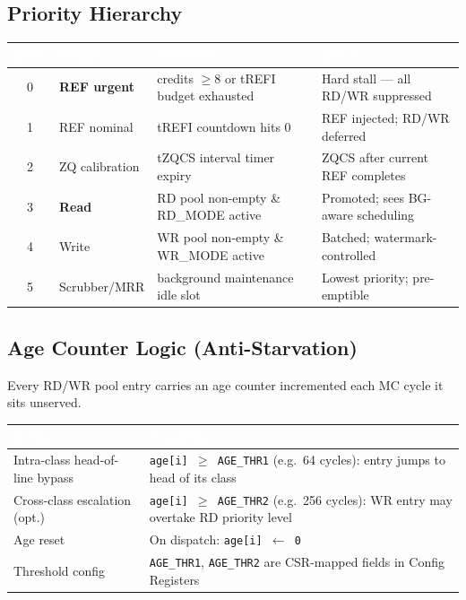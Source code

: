 \documentclass[11pt,a4paper]{article}
\newcommand{\THead}[1]{\cellcolor{navy}\textcolor{white}{\small\textbf{#1}}}
\newcommand{\RA}{\rowcolor{lgray}}
\newcommand{\RB}{\rowcolor{sky!30}}
\begin{document}
\subsection{Priority Hierarchy}

\begin{center}
\begin{tabularx}{\linewidth}{@{} c l l X @{}}
\toprule
\THead{Level} & \THead{Winner} & \THead{Condition} & \THead{Effect} \\
\midrule
\RA 0 & \textbf{REF urgent} & credits $\geq 8$ or tREFI budget exhausted &
  Hard stall — all RD/WR suppressed \\
\RB 1 & REF nominal & tREFI countdown hits 0 &
  REF injected; RD/WR deferred \\
\RA 2 & ZQ calibration & tZQCS interval timer expiry &
  ZQCS after current REF completes \\
\RB 3 & \textbf{Read} & RD pool non-empty \& RD\_MODE active &
  Promoted; sees BG-aware scheduling \\
\RA 4 & Write & WR pool non-empty \& WR\_MODE active &
  Batched; watermark-controlled \\
\RB 5 & Scrubber/MRR & background maintenance idle slot &
  Lowest priority; pre-emptible \\
\bottomrule
\end{tabularx}
\end{center}

\subsection{Age Counter Logic (Anti-Starvation)}

Every RD/WR pool entry carries an age counter incremented each MC cycle
it sits unserved.

\begin{center}
\begin{tabularx}{0.85\linewidth}{@{} l X @{}}
\toprule
\THead{Action} & \THead{Condition} \\
\midrule
\RA Intra-class head-of-line bypass &
  \texttt{age[i] $\geq$ AGE\_THR1} (e.g.\ 64 cycles): entry jumps to
  head of its class \\
\RB Cross-class escalation (opt.) &
  \texttt{age[i] $\geq$ AGE\_THR2} (e.g.\ 256 cycles): WR entry may
  overtake RD priority level \\
\RA Age reset & On dispatch: \texttt{age[i] $\leftarrow$ 0} \\
\RB Threshold config & \texttt{AGE\_THR1}, \texttt{AGE\_THR2} are
  CSR-mapped fields in Config Registers \\
\bottomrule
\end{tabularx}
\end{center}
\end{document}
